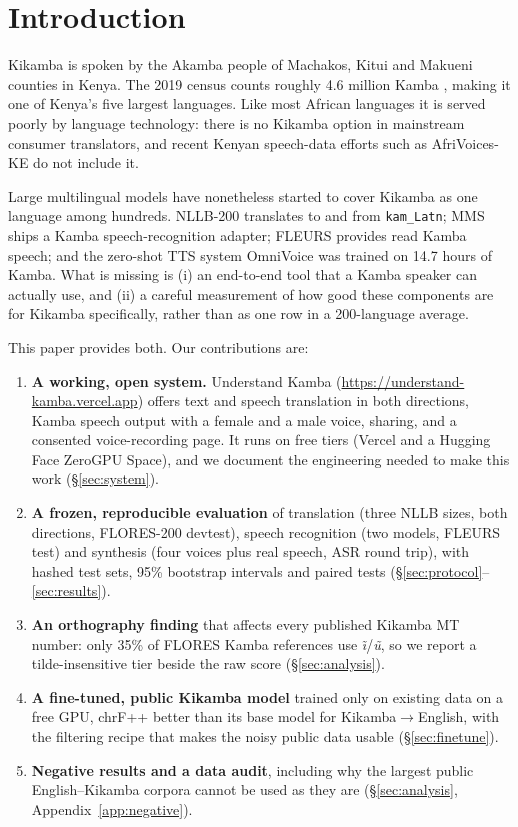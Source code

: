 \documentclass[11pt]{article}
\begin{document}
\section{Introduction}

Kikamba is spoken by the Akamba people of Machakos, Kitui and Makueni counties in Kenya. The 2019 census counts roughly 4.6 million Kamba \citep{knbs2019census}, making it one of Kenya's five largest languages. Like most African languages it is served poorly by language technology: there is no Kikamba option in mainstream consumer translators, and recent Kenyan speech-data efforts such as AfriVoices-KE \citep{wanzare2026afrivoices} do not include it.

Large multilingual models have nonetheless started to cover Kikamba as one language among hundreds. NLLB-200 \citep{nllb2022} translates to and from \texttt{kam\_Latn}; MMS \citep{pratap2024mms} ships a Kamba speech-recognition adapter; FLEURS \citep{conneau2023fleurs} provides read Kamba speech; and the zero-shot TTS system OmniVoice \citep{zhu2026omnivoice} was trained on 14.7 hours of Kamba. What is missing is (i) an end-to-end tool that a Kamba speaker can actually use, and (ii) a careful measurement of how good these components are for Kikamba specifically, rather than as one row in a 200-language average.

This paper provides both. Our contributions are:
\begin{enumerate}
  \item \textbf{A working, open system.} Understand Kamba (\url{https://understand-kamba.vercel.app}) offers text and speech translation in both directions, Kamba speech output with a female and a male voice, sharing, and a consented voice-recording page. It runs on free tiers (Vercel and a Hugging Face ZeroGPU Space), and we document the engineering needed to make this work (\S\ref{sec:system}).
  \item \textbf{A frozen, reproducible evaluation} of translation (three NLLB sizes, both directions, FLORES-200 devtest), speech recognition (two models, FLEURS test) and synthesis (four voices plus real speech, ASR round trip), with hashed test sets, 95\% bootstrap intervals and paired tests (\S\ref{sec:protocol}--\ref{sec:results}).
  \item \textbf{An orthography finding} that affects every published Kikamba MT number: only 35\% of FLORES Kamba references use \emph{\~{\i}}/\emph{\~{u}}, so we report a tilde-insensitive tier beside the raw score (\S\ref{sec:analysis}).
  \item \textbf{A fine-tuned, public Kikamba model} trained only on existing data on a free GPU, \ftGainFloresKamEn{} chrF++ better than its base model for Kikamba$\rightarrow$English, with the filtering recipe that makes the noisy public data usable (\S\ref{sec:finetune}).
  \item \textbf{Negative results and a data audit}, including why the largest public English--Kikamba corpora cannot be used as they are (\S\ref{sec:analysis}, Appendix~\ref{app:negative}).
\end{enumerate}
\end{document}

